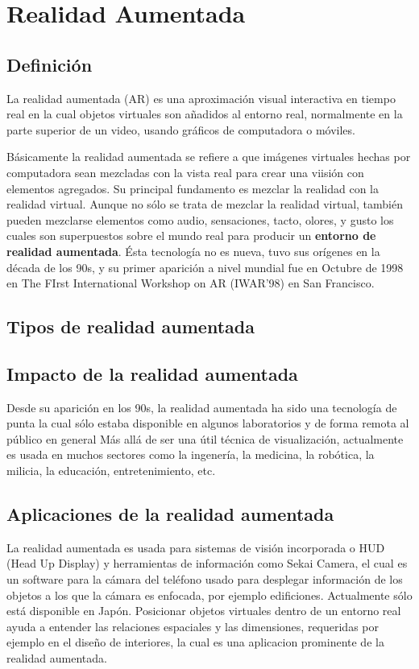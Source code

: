 \section{Realidad Aumentada}

\subsection{Definición}
La realidad aumentada (AR) es una aproximación visual interactiva en tiempo real en la cual objetos virtuales son añadidos al entorno real, normalmente en la parte superior de un video, usando gráficos de computadora o móviles.\cite{B04} \par
Básicamente la realidad aumentada se refiere a que imágenes virtuales hechas por computadora sean mezcladas con la vista real para crear una viisión con elementos agregados. Su principal fundamento es mezclar la realidad con la realidad virtual. Aunque no sólo se trata de mezclar la realidad virtual, también pueden mezclarse elementos como audio, sensaciones, tacto, olores, y gusto los cuales son superpuestos sobre el mundo real para producir un \textbf{entorno de realidad aumentada}.\cite{B05}
Ésta tecnología no es nueva, tuvo sus orígenes en la década de los 90s\cite{B04}, y su primer aparición a nivel mundial fue en Octubre de 1998 en The FIrst International Workshop on AR (IWAR'98) en San Francisco\cite{B05}.\par

\subsection{Tipos de realidad aumentada}

\subsection{Impacto de la realidad aumentada}
Desde su aparición en los 90s, la realidad aumentada ha sido una tecnología de punta la cual sólo estaba disponible en algunos laboratorios y de forma remota al público en general
Más allá de ser una útil técnica de visualización, actualmente es usada en muchos sectores como la ingenería, la medicina, la robótica, la milicia, la educación, entretenimiento, etc.

\subsection{Aplicaciones de la realidad aumentada}
La realidad aumentada es usada para sistemas de visión incorporada o HUD (Head Up Display) y herramientas de información como Sekai Camera, el cual es un software para la cámara del teléfono usado para desplegar información de los objetos a los que la cámara es enfocada, por ejemplo edificiones. Actualmente sólo está disponible en Japón.
Posicionar objetos virtuales dentro de un entorno real ayuda a entender las relaciones espaciales y las dimensiones, requeridas por ejemplo en el diseño de interiores, la cual es una aplicacion prominente de la realidad aumentada. 
